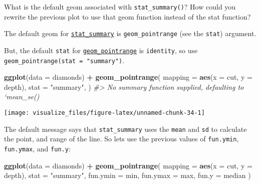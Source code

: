\documentclass[]{book}
\newenvironment{Shaded}{\begin{snugshade}}{\end{snugshade}}
\newcommand{\CommentTok}[1]{\textcolor[rgb]{0.56,0.35,0.01}{\textit{#1}}}
\newcommand{\DataTypeTok}[1]{\textcolor[rgb]{0.13,0.29,0.53}{#1}}
\newcommand{\KeywordTok}[1]{\textcolor[rgb]{0.13,0.29,0.53}{\textbf{#1}}}
\newcommand{\NormalTok}[1]{#1}
\newcommand{\OperatorTok}[1]{\textcolor[rgb]{0.81,0.36,0.00}{\textbf{#1}}}
\newcommand{\StringTok}[1]{\textcolor[rgb]{0.31,0.60,0.02}{#1}}
\theoremstyle{plain}
\theoremstyle{remark}
\theoremstyle{definition}
\theoremstyle{definition}
\theoremstyle{definition}
\theoremstyle{remark}
\begin{document}
What is the default geom associated with \texttt{stat\_summary()}? How
could you rewrite the previous plot to use that geom function instead of
the stat function?

The default geom for
\href{http://docs.ggplot2.org/current/stat_summary.html}{\texttt{stat\_summary}}
is \texttt{geom\_pointrange} (see the \texttt{stat}) argument.

But, the default \texttt{stat} for
\href{http://docs.ggplot2.org/current/geom_linerange.html}{\texttt{geom\_pointrange}}
is \texttt{identity}, so use
\texttt{geom\_pointrange(stat\ =\ "summary")}.

\begin{Shaded}
\begin{Highlighting}[]
\KeywordTok{ggplot}\NormalTok{(}\DataTypeTok{data =}\NormalTok{ diamonds) }\OperatorTok{+}
\StringTok{  }\KeywordTok{geom_pointrange}\NormalTok{(}
    \DataTypeTok{mapping =} \KeywordTok{aes}\NormalTok{(}\DataTypeTok{x =}\NormalTok{ cut, }\DataTypeTok{y =}\NormalTok{ depth),}
    \DataTypeTok{stat =} \StringTok{"summary"}\NormalTok{,}
\NormalTok{  )}
\CommentTok{#> No summary function supplied, defaulting to `mean_se()}
\end{Highlighting}
\end{Shaded}

\begin{center}\texttt{[image: visualize\_files/figure-latex/unnamed-chunk-34-1]} \end{center}

The default message says that \texttt{stat\_summary} uses the
\texttt{mean} and \texttt{sd} to calculate the point, and range of the
line. So lets use the previous values of \texttt{fun.ymin},
\texttt{fun.ymax}, and \texttt{fun.y}:

\begin{Shaded}
\begin{Highlighting}[]
\KeywordTok{ggplot}\NormalTok{(}\DataTypeTok{data =}\NormalTok{ diamonds) }\OperatorTok{+}
\StringTok{  }\KeywordTok{geom_pointrange}\NormalTok{(}
    \DataTypeTok{mapping =} \KeywordTok{aes}\NormalTok{(}\DataTypeTok{x =}\NormalTok{ cut, }\DataTypeTok{y =}\NormalTok{ depth),}
    \DataTypeTok{stat =} \StringTok{"summary"}\NormalTok{,}
    \DataTypeTok{fun.ymin =}\NormalTok{ min,}
    \DataTypeTok{fun.ymax =}\NormalTok{ max,}
    \DataTypeTok{fun.y =}\NormalTok{ median}
\NormalTok{  )}
\end{Highlighting}
\end{Shaded}
\end{document}
